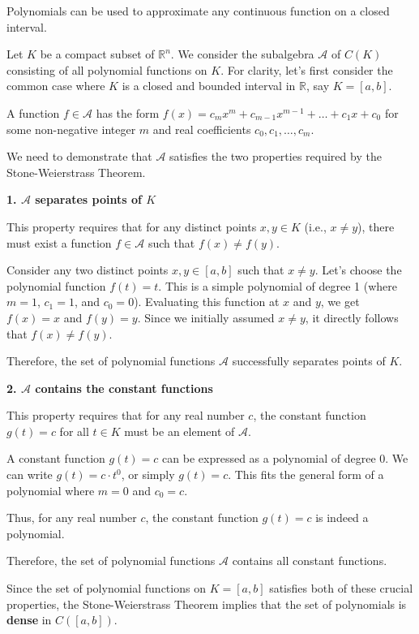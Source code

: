 \begin{example}
    Polynomials can be used to approximate any continuous function on a closed interval.
\end{example}

\begin{solution}
Let $K$ be a compact subset of $\mathbb{R}^n$. We consider the subalgebra $\mathcal{A}$ of $C(K)$ consisting of all polynomial functions on $K$. For clarity, let's first consider the common case where $K$ is a closed and bounded interval in $\mathbb{R}$, say $K = [a, b]$.

A function $f \in \mathcal{A}$ has the form $f(x) = c_m x^m + c_{m-1} x^{m-1} + \dots + c_1 x + c_0$ for some non-negative integer $m$ and real coefficients $c_0, c_1, \dots, c_m$.

We need to demonstrate that $\mathcal{A}$ satisfies the two properties required by the Stone-Weierstrass Theorem.

\textbf{1. $\mathcal{A}$ separates points of $K$}

This property requires that for any distinct points $x, y \in K$ (i.e., $x \neq y$), there must exist a function $f \in \mathcal{A}$ such that $f(x) \neq f(y)$.

Consider any two distinct points $x, y \in [a, b]$ such that $x \neq y$.
Let's choose the polynomial function $f(t) = t$. This is a simple polynomial of degree 1 (where $m=1$, $c_1=1$, and $c_0=0$).
Evaluating this function at $x$ and $y$, we get $f(x) = x$ and $f(y) = y$.
Since we initially assumed $x \neq y$, it directly follows that $f(x) \neq f(y)$.

Therefore, the set of polynomial functions $\mathcal{A}$ successfully separates points of $K$.

\textbf{2. $\mathcal{A}$ contains the constant functions}

This property requires that for any real number $c$, the constant function $g(t) = c$ for all $t \in K$ must be an element of $\mathcal{A}$.

A constant function $g(t) = c$ can be expressed as a polynomial of degree 0. We can write $g(t) = c \cdot t^0$, or simply $g(t) = c$. This fits the general form of a polynomial where $m=0$ and $c_0=c$.

Thus, for any real number $c$, the constant function $g(t)=c$ is indeed a polynomial.

Therefore, the set of polynomial functions $\mathcal{A}$ contains all constant functions.

Since the set of polynomial functions on $K=[a,b]$ satisfies both of these crucial properties, the Stone-Weierstrass Theorem implies that the set of polynomials is \textbf{dense} in $C([a,b])$. 
\end{solution}

